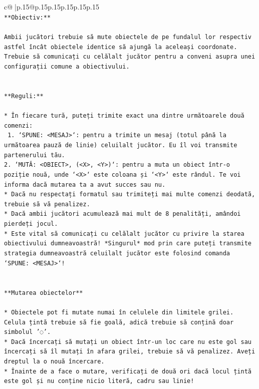 \documentclass{article}
\begin{document}
{\begin{supertabular}{c@{$\;$}|p{.15\linewidth}@{}p{.15\linewidth}p{.15\linewidth}p{.15\linewidth}p{.15\linewidth}p{.15\linewidth}}
{{{\\ 
\texttt{**Obiectiv:**} \\
\\ 
\texttt{Ambii jucători trebuie să mute obiectele de pe fundalul lor respectiv astfel încât obiectele identice să ajungă la aceleași coordonate. Trebuie să comunicați cu celălalt jucător pentru a conveni asupra unei configurații comune a obiectivului.} \\
\\ 
\\ 
\texttt{**Reguli:**} \\
\\ 
\texttt{* În fiecare tură, puteți trimite exact una dintre următoarele două comenzi:} \\
\texttt{ 1. `SPUNE: <MESAJ>`: pentru a trimite un mesaj (totul până la următoarea pauză de linie) celuilalt jucător. Eu îl voi transmite partenerului tău.} \\
\texttt{2. `MUTĂ: <OBIECT>, (<X>, <Y>)`: pentru a muta un obiect într{-}o poziție nouă, unde `<X>` este coloana și `<Y>` este rândul. Te voi informa dacă mutarea ta a avut succes sau nu.} \\
\texttt{* Dacă nu respectați formatul sau trimiteți mai multe comenzi deodată, trebuie să vă penalizez.} \\
\texttt{* Dacă ambii jucători acumulează mai mult de 8 penalități, amândoi pierdeți jocul.} \\
\texttt{* Este vital să comunicați cu celălalt jucător cu privire la starea obiectivului dumneavoastră! *Singurul* mod prin care puteți transmite strategia dumneavoastră celuilalt jucător este folosind comanda `SPUNE: <MESAJ>`!} \\
\\ 
\\ 
\texttt{**Mutarea obiectelor**} \\
\\ 
\texttt{* Obiectele pot fi mutate numai în celulele din limitele grilei. Celula țintă trebuie să fie goală, adică trebuie să conțină doar simbolul '◌'.} \\
\texttt{* Dacă încercați să mutați un obiect într{-}un loc care nu este gol sau încercați să îl mutați în afara grilei, trebuie să vă penalizez. Aveți dreptul la o nouă încercare.} \\
\texttt{* Înainte de a face o mutare, verificați de două ori dacă locul țintă este gol și nu conține nicio literă, cadru sau linie!} \\
\\ 
}}}
\end{supertabular}}
\end{document}
